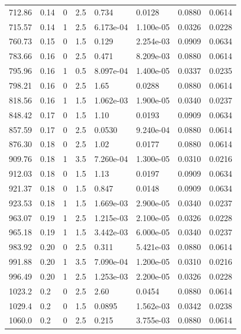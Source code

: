 \documentclass[preview]{standalone}
\begin{document}
{{{\begin{tabular}{L{1.2cm}C{1.2cm} C{0.3cm}C{0.5cm} C{1.4cm}C{1.4cm} C{1.4cm}C{1.4cm}}
  712.86  &  0.14  & 0     & 2.5 &  0.734  & 0.0128  & 0.0880 &  0.0614   \\ 
  715.57  &  0.14  & 1     & 2.5 &  6.173e-04  & 1.100e-05  & 0.0326 &  0.0228   \\ 
  760.73  &  0.15  & 0     & 1.5 &  0.129  & 2.254e-03  & 0.0909 &  0.0634   \\ 
  783.66  &  0.16  & 0     & 2.5 &  0.471  & 8.209e-03  & 0.0880 &  0.0614   \\ 
  795.96  &  0.16  & 1     & 0.5 &  8.097e-04  & 1.400e-05  & 0.0337 &  0.0235   \\ 
  798.21  &  0.16  & 0     & 2.5 &  1.65  & 0.0288  & 0.0880 &  0.0614   \\ 
  818.56  &  0.16  & 1     & 1.5 &  1.062e-03  & 1.900e-05  & 0.0340 &  0.0237   \\ 
  848.42  &  0.17  & 0     & 1.5 &  1.10  & 0.0193  & 0.0909 &  0.0634   \\ 
  857.59  &  0.17  & 0     & 2.5 &  0.0530  & 9.240e-04  & 0.0880 &  0.0614   \\ 
  876.30  &  0.18  & 0     & 2.5 &  1.02  & 0.0177  & 0.0880 &  0.0614   \\ 
  909.76  &  0.18  & 1     & 3.5 &  7.260e-04  & 1.300e-05  & 0.0310 &  0.0216   \\ 
  912.03  &  0.18  & 0     & 1.5 &  1.13  & 0.0197  & 0.0909 &  0.0634   \\ 
  921.37  &  0.18  & 0     & 1.5 &  0.847  & 0.0148  & 0.0909 &  0.0634   \\ 
  923.53  &  0.18  & 1     & 1.5 &  1.669e-03  & 2.900e-05  & 0.0340 &  0.0237   \\ 
  963.07  &  0.19  & 1     & 2.5 &  1.215e-03  & 2.100e-05  & 0.0326 &  0.0228   \\ 
  965.18  &  0.19  & 1     & 1.5 &  3.442e-03  & 6.000e-05  & 0.0340 &  0.0237   \\ 
  983.92  &  0.20  & 0     & 2.5 &  0.311  & 5.421e-03  & 0.0880 &  0.0614   \\ 
  991.88  &  0.20  & 1     & 3.5 &  7.090e-04  & 1.200e-05  & 0.0310 &  0.0216   \\ 
  996.49  &  0.20  & 1     & 2.5 &  1.253e-03  & 2.200e-05  & 0.0326 &  0.0228   \\ 
  1023.2  &   0.2  & 0     & 2.5 &  2.60  & 0.0454  & 0.0880 &  0.0614   \\ 
  1029.4  &   0.2  & 0     & 1.5 &  0.0895  & 1.562e-03  & 0.0342 &  0.0238   \\ 
  1060.0  &   0.2  & 0     & 2.5 &  0.215  & 3.755e-03  & 0.0880 &  0.0614   \\ 

\end{tabular}}}}
\end{document}

